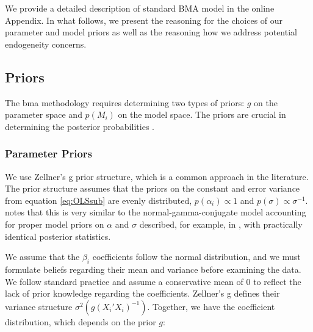 \documentclass[a4paper,11pt]{article}
\begin{document}
We provide a detailed description of standard BMA model in the online Appendix. In what follows, we present the reasoning for the choices of our parameter and model priors as well as the reasoning how we address potential endogeneity concerns. 

\subsection*{Priors}
\label{sec:priors}
The \ac{bma} methodology requires determining two types of priors: $g$ on the parameter space and $p(M_{i})$ on the model space. The priors are crucial in determining the posterior probabilities \citep{FeldkircherZeugner2009,CicconeJarocinski2010,Liangetal2008}.

\subsubsection*{Parameter Priors}
We use Zellner's g prior structure, which is a common approach in the literature. The prior structure assumes that the priors on the constant and error variance from equation \ref{eq:OLSsub} are evenly distributed, $p(\alpha_{i}) \propto 1$ and $p(\sigma) \propto \sigma^{-1}$. \citet{Zeugner2011} notes that this is very similar to the normal-gamma-conjugate model accounting for proper model priors on $\alpha$ and $\sigma$ described, for example, in \citet{Koop2003}, with practically identical posterior statistics. 

We assume that the $\beta_{i}$ coefficients follow the normal distribution, and we must formulate beliefs regarding their mean and variance before examining the data. We follow standard practice and assume a conservative mean of 0 to reflect the lack of prior knowledge regarding the coefficients. Zellner's g defines their variance structure $\sigma^{2}(g(X_{i}'X_{i})^{-1})$. Together, we have the coefficient distribution, which depends on the prior $g$:
\end{document}
